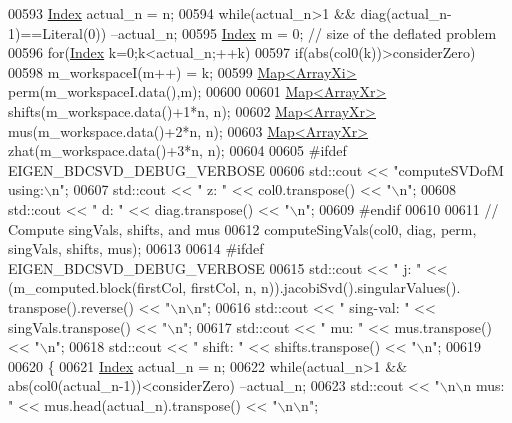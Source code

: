 \begin{DoxyCode}
00593   \hyperlink{namespace_eigen_a62e77e0933482dafde8fe197d9a2cfde}{Index} actual\_n = n;
00594   \textcolor{keywordflow}{while}(actual\_n>1 && diag(actual\_n-1)==Literal(0)) --actual\_n;
00595   \hyperlink{namespace_eigen_a62e77e0933482dafde8fe197d9a2cfde}{Index} m = 0; \textcolor{comment}{// size of the deflated problem}
00596   \textcolor{keywordflow}{for}(\hyperlink{namespace_eigen_a62e77e0933482dafde8fe197d9a2cfde}{Index} k=0;k<actual\_n;++k)
00597     \textcolor{keywordflow}{if}(abs(col0(k))>considerZero)
00598       m\_workspaceI(m++) = k;
00599   \hyperlink{group___core___module_class_eigen_1_1_map}{Map<ArrayXi>} perm(m\_workspaceI.data(),m);
00600   
00601   \hyperlink{group___core___module_class_eigen_1_1_map}{Map<ArrayXr>} shifts(m\_workspace.data()+1*n, n);
00602   \hyperlink{group___core___module_class_eigen_1_1_map}{Map<ArrayXr>} mus(m\_workspace.data()+2*n, n);
00603   \hyperlink{group___core___module_class_eigen_1_1_map}{Map<ArrayXr>} zhat(m\_workspace.data()+3*n, n);
00604 
00605 \textcolor{preprocessor}{#ifdef EIGEN\_BDCSVD\_DEBUG\_VERBOSE}
00606   std::cout << \textcolor{stringliteral}{"computeSVDofM using:\(\backslash\)n"};
00607   std::cout << \textcolor{stringliteral}{"  z: "} << col0.transpose() << \textcolor{stringliteral}{"\(\backslash\)n"};
00608   std::cout << \textcolor{stringliteral}{"  d: "} << diag.transpose() << \textcolor{stringliteral}{"\(\backslash\)n"};
00609 \textcolor{preprocessor}{#endif}
00610   
00611   \textcolor{comment}{// Compute singVals, shifts, and mus}
00612   computeSingVals(col0, diag, perm, singVals, shifts, mus);
00613   
00614 \textcolor{preprocessor}{#ifdef EIGEN\_BDCSVD\_DEBUG\_VERBOSE}
00615   std::cout << \textcolor{stringliteral}{"  j:        "} << (m\_computed.block(firstCol, firstCol, n, n)).jacobiSvd().singularValues().
      transpose().reverse() << \textcolor{stringliteral}{"\(\backslash\)n\(\backslash\)n"};
00616   std::cout << \textcolor{stringliteral}{"  sing-val: "} << singVals.transpose() << \textcolor{stringliteral}{"\(\backslash\)n"};
00617   std::cout << \textcolor{stringliteral}{"  mu:       "} << mus.transpose() << \textcolor{stringliteral}{"\(\backslash\)n"};
00618   std::cout << \textcolor{stringliteral}{"  shift:    "} << shifts.transpose() << \textcolor{stringliteral}{"\(\backslash\)n"};
00619   
00620   \{
00621     \hyperlink{namespace_eigen_a62e77e0933482dafde8fe197d9a2cfde}{Index} actual\_n = n;
00622     \textcolor{keywordflow}{while}(actual\_n>1 && abs(col0(actual\_n-1))<considerZero) --actual\_n;
00623     std::cout << \textcolor{stringliteral}{"\(\backslash\)n\(\backslash\)n    mus:    "} << mus.head(actual\_n).transpose() << \textcolor{stringliteral}{"\(\backslash\)n\(\backslash\)n"};

\end{DoxyCode}
